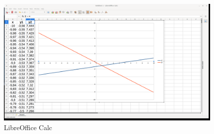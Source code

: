 \begin{figure}[h!]		
	\centering
   	\includegraphics[width=8.0in]{pictures/picture_020.png}
  	\caption{LibreOffice Calc}
   	\label{fig:LibreOfficeCalc020}
\end{figure}